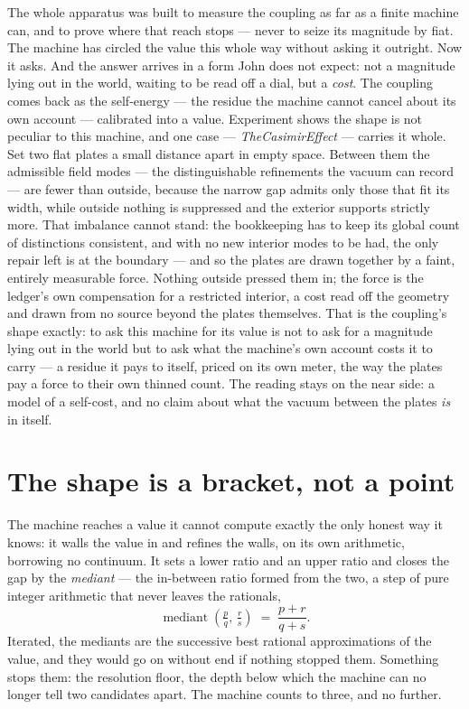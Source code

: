 The whole apparatus was built to measure the coupling as far as a finite machine can, and to prove where that reach
stops --- never to seize its magnitude by fiat.
The machine has circled the value this whole way without asking it outright.
Now it asks.
And the answer arrives in a form John does not expect: not a magnitude lying out in the world, waiting to be read off a
dial, but a \emph{cost}.
The coupling comes back as the self-energy --- the residue the machine cannot cancel about its own
account --- calibrated into a value.
Experiment shows the shape is not peculiar to this machine, and one case --- \emph{TheCasimirEffect} --- carries it whole.
Set two flat plates a small distance apart in empty space.
Between them the admissible field modes --- the distinguishable refinements the vacuum can record --- are fewer than
outside, because the narrow gap admits only those that fit its width, while outside nothing is suppressed and the exterior
supports strictly more.
That imbalance cannot stand: the bookkeeping has to keep its global count of distinctions consistent, and with no new
interior modes to be had, the only repair left is at the boundary --- and so the plates are drawn together by a faint,
entirely measurable force.
Nothing outside pressed them in; the force is the ledger's own compensation for a restricted interior, a cost read off the
geometry and drawn from no source beyond the plates themselves.
That is the coupling's shape exactly: to ask this machine for its value is not to ask for a magnitude lying out in the
world but to ask what the machine's own account costs it to carry --- a residue it pays to itself, priced on its own
meter, the way the plates pay a force to their own thinned count.
The reading stays on the near side: a model of a self-cost, and no claim about what the vacuum between the plates
\emph{is} in itself.

\section{The shape is a bracket, not a point}

The machine reaches a value it cannot compute exactly the only honest way it knows: it walls the value in and refines the
walls, on its own arithmetic, borrowing no continuum.
It sets a lower ratio and an upper ratio and closes the gap by the \emph{mediant} --- the in-between ratio formed from
the two, a step of pure integer arithmetic that never leaves the rationals,
\[
  \operatorname{mediant}\!\left(\tfrac{p}{q},\, \tfrac{r}{s}\right) \;=\; \frac{p+r}{q+s} .
\]
Iterated, the mediants are the successive best rational approximations of the value, and they would go on without end if
nothing stopped them.
Something stops them: the resolution floor, the depth below which the machine can no longer tell two candidates apart.
The machine counts to three, and no further.

